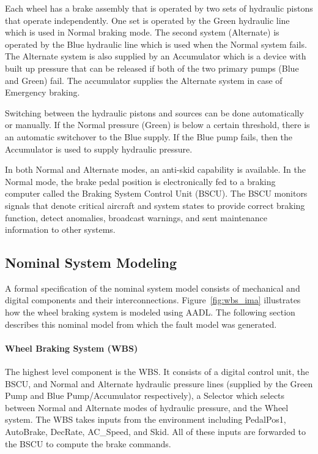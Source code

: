 Each wheel has a brake assembly that is operated by two sets of hydraulic pistons that operate independently. One set is operated by the Green hydraulic line which is used in Normal braking mode. The second system (Alternate) is operated by the Blue hydraulic line which is used when the Normal system fails. The Alternate system is also supplied by an Accumulator which is a device with built up pressure that can be released if both of the two primary pumps (Blue and Green) fail. The accumulator supplies the Alternate system in case of Emergency braking.

Switching between the hydraulic pistons and sources can be done automatically or manually. If the Normal pressure (Green) is below a certain threshold, there is an automatic switchover to the Blue supply. If the Blue pump fails, then the Accumulator is used to supply hydraulic pressure.

In both Normal and Alternate modes, an anti-skid capability is available. In the Normal mode, the brake pedal position is electronically fed to a braking computer called the Braking System Control Unit (BSCU). The BSCU monitors signals that denote critical aircraft and system states to provide correct braking function, detect anomalies, broadcast warnings, and sent maintenance information to other systems.

\subsection{Nominal System Modeling}
\label{sec:nominal}
A formal specification of the nominal system model consists of mechanical and digital components and their interconnections. Figure~\ref{fig:wbs_ima} illustrates how the wheel braking system is modeled using AADL. The following section describes this nominal model from which the fault model was generated.

\paragraph{Wheel Braking System (WBS)}
The highest level component is the WBS. It consists of a digital control unit, the BSCU, and Normal and Alternate hydraulic pressure lines (supplied by the Green Pump and Blue Pump/Accumulator respectively), a Selector which selects between Normal and Alternate modes of hydraulic pressure, and the Wheel system. The WBS takes inputs from the environment including PedalPos1, AutoBrake, DecRate, AC\_Speed, and Skid. All of these inputs are forwarded to the BSCU to compute the brake commands.

